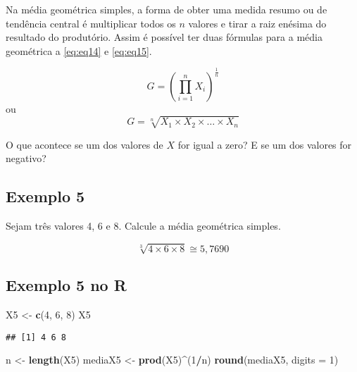 \documentclass[
]{book}
\newenvironment{Shaded}{\begin{snugshade}}{\end{snugshade}}
\newcommand{\DataTypeTok}[1]{\textcolor[rgb]{0.13,0.29,0.53}{#1}}
\newcommand{\DecValTok}[1]{\textcolor[rgb]{0.00,0.00,0.81}{#1}}
\newcommand{\KeywordTok}[1]{\textcolor[rgb]{0.13,0.29,0.53}{\textbf{#1}}}
\newcommand{\NormalTok}[1]{#1}
\newcommand{\OperatorTok}[1]{\textcolor[rgb]{0.81,0.36,0.00}{\textbf{#1}}}
\newcommand{\StringTok}[1]{\textcolor[rgb]{0.31,0.60,0.02}{#1}}
\begin{document}
Na média geométrica simples, a forma de obter uma medida resumo ou de tendência central é multiplicar todos os \(n\) valores e tirar a raiz enésima do resultado do produtório. Assim é possível ter duas fórmulas para a média geométrica a \eqref{eq:eq14} e \eqref{eq:eq15}.

\begin{equation}
    G = \left(\prod_{i=1}^{n} X_i \right)^{\frac{1}{n}}
    \label{eq:eq14}
\end{equation}
ou
\begin{equation}
    G = \sqrt[n]{X_1 \times X_2 \times \ldots \times X_n}
    \label{eq:eq15}
\end{equation}

O que acontece se um dos valores de \(X\) for igual a zero? E se um dos valores for negativo?

\hypertarget{exemplo-5}{%
\subsection{Exemplo 5}\label{exemplo-5}}

Sejam três valores 4, 6 e 8. Calcule a média geométrica simples.

\begin{equation*}
  \sqrt[3]{4 \times 6 \times 8} \cong 5,7690
\end{equation*}

\hypertarget{exemplo-5-no-r}{%
\subsection{Exemplo 5 no R}\label{exemplo-5-no-r}}

\begin{Shaded}
\begin{Highlighting}[]
\NormalTok{X5 <-}\StringTok{ }\KeywordTok{c}\NormalTok{(}\DecValTok{4}\NormalTok{, }\DecValTok{6}\NormalTok{, }\DecValTok{8}\NormalTok{)}
\NormalTok{X5}
\end{Highlighting}
\end{Shaded}

\begin{verbatim}
## [1] 4 6 8
\end{verbatim}

\begin{Shaded}
\begin{Highlighting}[]
\NormalTok{n <-}\StringTok{ }\KeywordTok{length}\NormalTok{(X5)}
\NormalTok{mediaX5 <-}\StringTok{ }\KeywordTok{prod}\NormalTok{(X5)}\OperatorTok{^}\NormalTok{(}\DecValTok{1}\OperatorTok{/}\NormalTok{n)}
\KeywordTok{round}\NormalTok{(mediaX5, }\DataTypeTok{digits =} \DecValTok{1}\NormalTok{)}
\end{Highlighting}
\end{Shaded}
\end{document}

